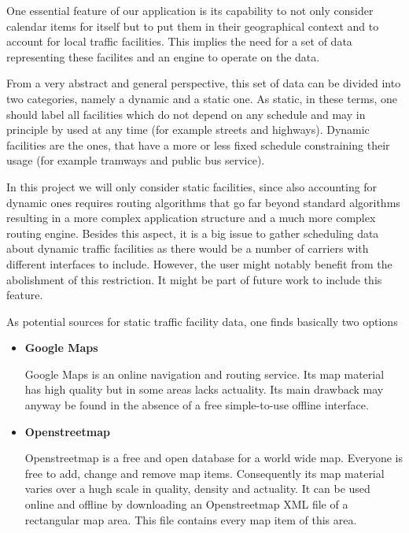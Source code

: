 One essential feature of our application is its capability to not only consider calendar items for itself but to put them in their geographical context and to account for local traffic facilities. This implies the need for a set of data representing these facilites and an engine to operate on the data.\newline

From a very abstract and general perspective, this set of data can be divided into two categories, namely a dynamic and a static one. As static, in these terms, one should label all facilities which do not depend on any schedule and may in principle by used at any time (for example streets and highways). Dynamic facilities are the ones, that have a more or less fixed schedule constraining their usage (for example tramways and public bus service).\newline

In this project we will only consider static facilities, since also accounting for dynamic ones requires routing algorithms that go far beyond standard algorithms resulting in a more complex application structure and a much more complex routing engine. Besides this aspect, it is a big issue to gather scheduling data about dynamic traffic facilities as there would be a number of carriers with different interfaces to include. However, the user might notably benefit from the abolishment of this restriction. It might be part of future work to include this feature.\newline
 
As potential sources for static traffic facility data, one finds basically two options

\begin{itemize}
 
	\item \textbf{Google Maps}
	
		Google Maps is an online navigation and routing service. Its map material has high quality but in some areas lacks actuality. Its main drawback may anyway be found in the absence of a free simple-to-use offline interface. 
	
	\item \textbf{Openstreetmap}
	
		Openstreetmap is a free and open database for a world wide map. Everyone is free to add, change and remove map items. Consequently its map material varies over a hugh scale in quality, density and actuality. It can be used online and offline by downloading an Openstreetmap XML file of a rectangular map area. This file contains every map item of this area.
  
\end{itemize} 

